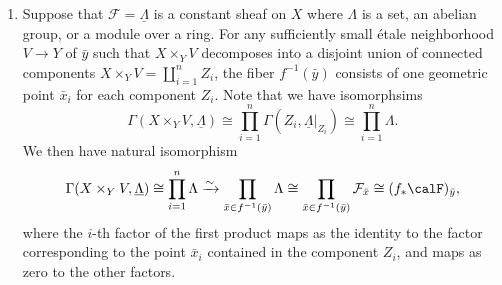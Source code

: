 \begin{proposition}
\begin{enumerate}
        \item Suppose that $\mathcal{F} = \underline{\Lambda}$ is a constant sheaf on $X$ where $\Lambda$ is a set, an abelian group, or a module over a ring. For any sufficiently small étale neighborhood $V \to Y$ of $\bar{y}$ such that $X \times_Y V$ decomposes into a disjoint union of connected components $X \times_Y V = \coprod_{i=1}^n Z_i$, the fiber $f^{-1}(\bar{y})$ consists of one geometric point $\bar{x}_i$ for each component $Z_i$. Note that we have isomorphsims
        $$\Gamma(X \times_Y V, \underline{\Lambda}) \cong \prod_{i=1}^n \Gamma(Z_i, \underline{\Lambda}|_{Z_i}) \cong \prod_{i=1}^n \Lambda.$$
        We then have natural isomorphism 
        $$\Gamma(X \times_Y V, \underline{\Lambda}) \cong \prod_{i=1}^n \Lambda \xrightarrow{\sim} \prod_{\bar{x} \in f^{-1}(\bar{y})} \Lambda \cong \prod_{\bar{x} \in f^{-1}(\bar{y})} \mathcal{F}_{\bar{x}} \cong (f_* \calF)_{\bar{y}},$$
        where the $i$-th factor of the first product maps as the identity to the factor corresponding to the point $\bar{x}_i$ contained in the component $Z_i$, and maps as zero to the other factors.
    \end{enumerate}


\end{proposition}



